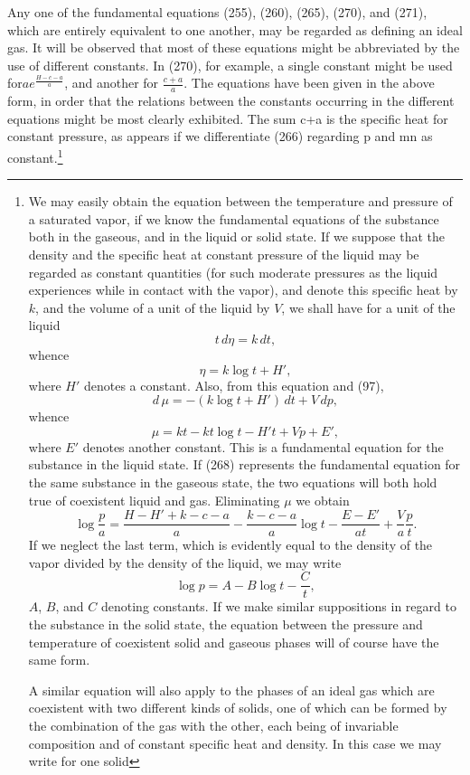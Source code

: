 \documentclass[12pt]{memoir}
\begin{document}
Any one of the fundamental equations (255), (260), (265), (270), and (271), which are entirely equivalent to one another, may be regarded as defining an ideal gas. It will be observed that most of these equations might be abbreviated by the use of different constants. In (270), for example, a single constant might be used for$a e^{\frac{H-c-a}{a}}$, and another for $\frac{c+a}{a}$. The equations have been given in the above form, in order that the relations between the constants occurring in the different equations might be most clearly exhibited. The sum c+a is the specific heat for constant pressure, as appears if we differentiate (266) regarding p and mn as constant.\footnote{We may easily obtain the equation between the temperature and pressure of a saturated vapor, if we know the fundamental equations of the substance both in the gaseous, and in the liquid or solid state. If we suppose that the density and the specific heat at constant pressure of the liquid may be regarded as constant quantities (for such moderate pressures as the liquid experiences while in contact with the vapor), and denote this specific heat by $k$, and the volume of a unit of the liquid by $V$, we shall have for a unit of the liquid
$$t \,d\eta=k\,dt,$$
whence%
$$\eta= k \log t + H',$$%
where $H'$ denotes a constant. Also, from this equation and (97),
$$ d\, \mu = -(k \log t + H')\,dt+ V\,dp,$$
whence %
$$\mu= kt- kt \log t - H't + Vp + E', $$%
where $E'$ denotes another constant. This is a fundamental equation for the substance in the liquid state. If (268) represents the fundamental equation for the same substance in the gaseous state, the two equations will both hold true of coexistent liquid and gas. Eliminating $\mu$ we obtain
$$ \log \frac{p}{a}=\frac{H-H'+k -c-a}{a} -\frac{k-c-a}{a}\log t - \frac{E - E'}{at} + \frac{V}{a} \frac{p}{t}. $$
If we neglect the last term, which is evidently equal to the density of the vapor divided by the density of the liquid, we may write
$$\log p= A - B \log t- \frac{C}{t},$$
$A$, $B$, and $C$ denoting constants. If we make similar suppositions in regard to the substance in the solid state, the equation between the pressure and temperature of coexistent solid and gaseous phases will of course have the same form.
\par A similar equation will also apply to the phases of an ideal gas which are coexistent with two different kinds of solids, one of which can be formed by the combination of the gas with the other, each being of invariable composition and of constant specific heat and density. In this case we may write for one solid
}
\end{document}
